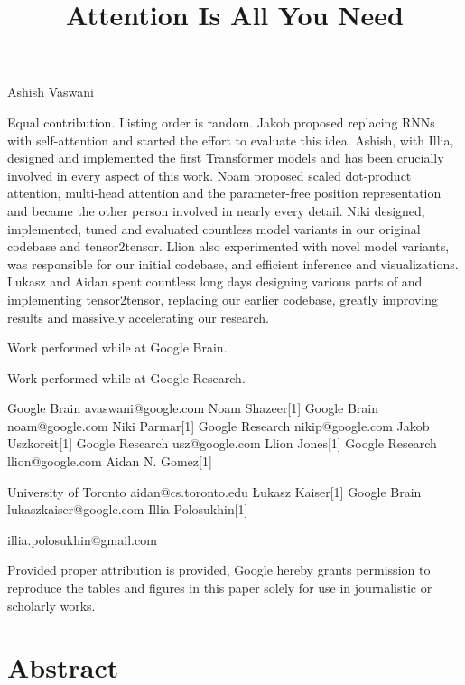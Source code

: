 \documentclass[11pt,a4paper]{article}
\title{Attention Is All You Need}
\begin{document}
\maketitle

Ashish Vaswani

Equal contribution. Listing order is random. Jakob proposed replacing RNNs with self-attention and started the effort to evaluate this idea. Ashish, with Illia, designed and implemented the first Transformer models and has been crucially involved in every aspect of this work. Noam proposed scaled dot-product attention, multi-head attention and the parameter-free position representation and became the other person involved in nearly every detail. Niki designed, implemented, tuned and evaluated countless model variants in our original codebase and tensor2tensor. Llion also experimented with novel model variants, was responsible for our initial codebase, and efficient inference and visualizations. Lukasz and Aidan spent countless long days designing various parts of and implementing tensor2tensor, replacing our earlier codebase, greatly improving results and massively accelerating our research.

Work performed while at Google Brain.

Work performed while at Google Research.

Google Brain avaswani@google.com Noam Shazeer[1] Google Brain noam@google.com Niki Parmar[1] Google Research nikip@google.com Jakob Uszkoreit[1] Google Research usz@google.com Llion Jones[1] Google Research llion@google.com Aidan N. Gomez[1]

University of Toronto aidan@cs.toronto.edu Łukasz Kaiser[1] Google Brain lukaszkaiser@google.com Illia Polosukhin[1]

illia.polosukhin@gmail.com

Provided proper attribution is provided, Google hereby grants permission to reproduce the tables and figures in this paper solely for use in journalistic or scholarly works.

\section{Abstract}
\end{document}
